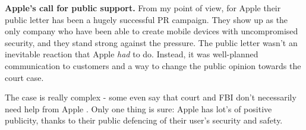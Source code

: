 \documentclass[twoside]{article}
\begin{document}
\bigskip\noindent\textbf{Apple's call for public support.} From my point of view, for Apple their public letter has been a hugely successful PR campaign. They show up as the only company who have been able to create mobile devices with uncompromised security, and they stand strong against the pressure. The public letter wasn't an inevitable reaction that Apple \textit{had} to do. Instead, it was well-planned communication to customers and a way to change the public opinion towards the court case.

\bigskip\noindent The case is really complex - some even say that court and FBI don't necessarily need help from Apple \cite{thereareotherways}. Only one thing is sure: Apple has lot's of positive publicity, thanks to their public defencing of their user's security and safety.
\newpage
\printbibliography
\end{document}

